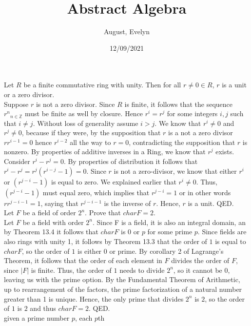 \documentclass{article}
\title{Abstract Algebra}
\author{August, Evelyn}
\date{12/09/2021}
\newcommand{\Z}{\mathbb{Z}}
\begin{document}
\maketitle

 Let $R$ be a finite commutative ring with unity. Then for all $r\ne 0\in R$, $r$ is a unit or a zero divisor.\\

 Suppose $r$ is not a zero divisor. Since $R$ is finite, it follows that the sequence ${r^n}_{n\in \Z}$ must be finite as well by closure. Hence $r^i = r^j$ for some integers $i,j$ such that $i\ne j $. Without loss of generality assume $i> j$. We know that $r^i \ne 0$ and $r^j \ne 0$, because if they were, by the supposition that $r$ is a not a zero divisor $rr^{i-1} = 0$ hence $r^{i-2}$ all the way to $r = 0$, contradicting the supposition that $r$ is nonzero. By properties of additive inverses in a Ring, we know that $r^j$ exists. Consider $r^{i}-r^j=0$. By properties of distribution it follows that $r^{i}-r^j=r^j(r^{i-j}-1)=0 $. Since $r$ is not a zero-divisor, we know that either $r^{i}$ or $(r^{j-i}-1)$ is equal to zero. We explained earlier that $r^{i} \ne 0$. Thus, $(r^{j-i}-1)$ must equal zero, which implies that $r^{j-i}=1$ or in other words $rr^{j-i-1}=1$, saying that $r^{j-i-1}$ is the inverse of $r$. Hence, $r$ is a unit. QED.\\

 Let $F$ be a field of order $2^n$. Prove that $charF=2$. \\

 Let $F$ be a field with order $2^n$. Since F is a field, it is also an integral domain, an by Theorem 13.4 it follows that $charF$ is $0$ or $p$ for some prime $p$. Since fields are also rings with unity 1, it follows by Theorem 13.3 that the order of $1$ is equal to $charF$, so the order of $1$ is either $0$ or prime. By corollary 2 of Lagrange's Theorem, it follows that the order of each element in $F$ divides the order of $F$, since $|F|$ is finite. Thus, the order of $1$ needs to divide $2^n$, so it cannot be $0$, leaving us with the prime option. By the Fundamental Theorem of Arithmetic, up to rearrangement of the factors, the prime factorization of a natural number greater than 1 is unique. Hence, the only prime that divides $2^n$ is $2$, so the order of $1$ is $2$ and thus $charF=2$. QED.\\ 

 given a prime number $p$, each $p$th 
\end{document}
